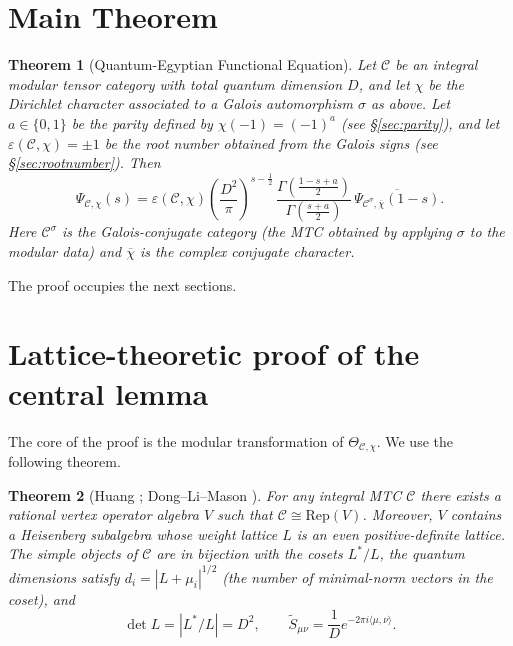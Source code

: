 \documentclass[12pt,a4paper]{article}
\newtheorem{theorem}{Theorem}[section]
\theoremstyle{definition}
\theoremstyle{remark}
\begin{document}

\section{Main Theorem}

\begin{theorem}[Quantum-Egyptian Functional Equation]\label{thm:main}
Let $\mathcal{C}$ be an integral modular tensor category with total quantum
dimension $D$, and let $\chi$ be the Dirichlet character associated to a Galois
automorphism $\sigma$ as above. Let $a\in\{0,1\}$ be the parity defined by
$\chi(-1)=(-1)^a$ (see \S\ref{sec:parity}), and let
$\varepsilon(\mathcal{C},\chi)=\pm1$ be the root number obtained from the Galois
signs (see \S\ref{sec:rootnumber}). Then
\[
\Psi_{\mathcal{C},\chi}(s)=\varepsilon(\mathcal{C},\chi)
  \left(\frac{D^2}{\pi}\right)^{s-\frac12}\,
  \frac{\Gamma\!\left(\frac{1-s+a}{2}\right)}{\Gamma\!\left(\frac{s+a}{2}\right)}\,
  \overline{\Psi_{\mathcal{C}^{\sigma},\overline{\chi}}(1-s)}.
\]
Here $\mathcal{C}^{\sigma}$ is the Galois-conjugate category (the MTC obtained by
applying $\sigma$ to the modular data) and $\overline{\chi}$ is the complex
conjugate character.
\end{theorem}

The proof occupies the next sections.


\section{Lattice-theoretic proof of the central lemma}

The core of the proof is the modular transformation of
$\Theta_{\mathcal{C},\chi}$. We use the following theorem.

\begin{theorem}[Huang \cite{Huang}; Dong--Li--Mason \cite{DLM}]\label{thm:huang}
For any integral MTC $\mathcal{C}$ there exists a rational vertex operator algebra
$V$ such that $\mathcal{C}\cong\mathrm{Rep}(V)$. Moreover, $V$ contains a
Heisenberg subalgebra whose weight lattice $L$ is an even positive-definite
lattice. The simple objects of $\mathcal{C}$ are in bijection with the cosets
$L^*/L$, the quantum dimensions satisfy
$d_i = |L+\mu_i|^{1/2}$ (the number of minimal-norm vectors in the coset), and
\[
\det L = |L^*/L| = D^2,\qquad
\tilde{S}_{\mu\nu}= \frac1D e^{-2\pi i\langle\mu,\nu\rangle}.
\]
\end{theorem}
\end{document}
